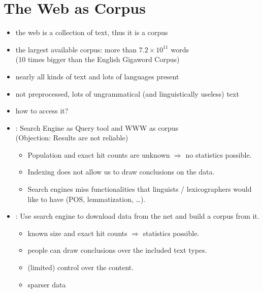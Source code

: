 \documentclass[a4paper,landscape,headrule,footrule,xetex]{foils}
\begin{document}
\section{The Web as Corpus}


\MyLogo{}
\begin{itemize}
\item the web is a collection of text, thus it is a corpus
\item the largest available corpus: more than $7.2 \times 10^{11}$ words 
\\ (10 times bigger than the English Gigaword Corpus) %
\item nearly all kinds of text and lots of languages present
\item not preprocessed, lots of ungrammatical (and linguistically useless) text
\item how to access it?
\end{itemize}

\begin{itemize}
\item {}: Search Engine as Query tool and WWW as corpus
\\  (Objection: Results are not reliable)
\begin{itemize}
\item Population and exact hit counts are unknown $\Rightarrow$ no statistics
possible.
\item Indexing does not allow us to draw conclusions on the data.
\item[\Bad] Search engines miss functionalities that linguists /
lexicographers would like to have (POS, lemmatization, \ldots).
\end{itemize}
\item {}: Use search engine to download data from the
net and build a corpus from it.
\begin{itemize}
\item known size and exact hit counts $\Rightarrow$ statistics possible.
\item people can draw conclusions over the included text types.
\item (limited) control over the content.
\item[\Bad] sparser data
\end{itemize}
\end{itemize}
\end{document}
